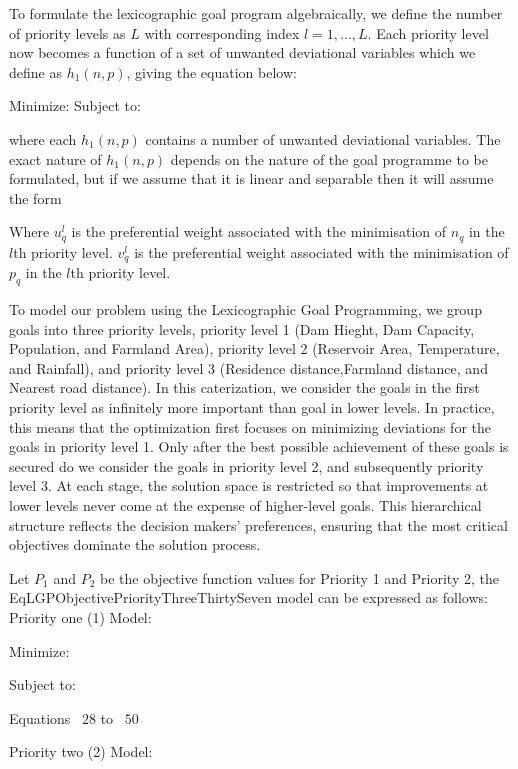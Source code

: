 To formulate the lexicographic goal program algebraically, we define the number of priority levels as $L$ with corresponding index $l = 1, ..., L.$ Each priority level now becomes a function of a set of unwanted deviational variables which we define as $h_1(n, p)$, giving the equation below:

Minimize:
            \EqLObjectiveThirtyThree
Subject to:
            \EqGGPMinFunctionSubTwo
            \EqCGPConstraintEight
            \EqGGPMinFunctionSubFour   

where each $h_1(n,p)$ contains a number of unwanted deviational variables. The exact nature of $h_1(n,p)$ depends on the nature of the goal programme to be formulated, but if we assume that it is linear and separable then it will assume the form 

            \EqLObjectiveThirtyFour

Where $u_q^l$ is the preferential weight associated with the minimisation of $n_q$ in the $l$th priority level. $v_q^l$ is the preferential weight associated with the minimisation of $p_q$ in the $l$th priority level. 

To model our problem using the Lexicographic Goal Programming, we group goals into three priority levels, priority level 1 (Dam Hieght, Dam Capacity, Population, and Farmland Area), priority level 2 (Reservoir Area, Temperature, and Rainfall), and priority level 3 (Residence distance,Farmland distance, and Nearest road distance). In this caterization, we consider the goals in the first priority level as infinitely more important than goal in lower levels.
In practice, this means that the optimization first focuses on minimizing deviations for the goals in priority level 1. Only after the best possible achievement of these goals is secured do we consider the goals in priority level 2, and subsequently priority level 3. At each stage, the solution space is restricted so that improvements at lower levels never come at the expense of higher-level goals. This hierarchical structure reflects the decision makers' preferences, ensuring that the most critical objectives dominate the solution process.

Let $P_1$ and $P_2$ be the objective function values for Priority 1 and Priority 2, the EqLGPObjectivePriorityThreeThirtySeven model can be expressed as follows:
Priority one (1) Model:

Minimize:
        \EqLGPObjectivePriorityOneThirtyFive

Subject to:

       \begin{center}
        Equations ~$28$ to ~$50$
        \end{center}  
Priority two (2) Model:

